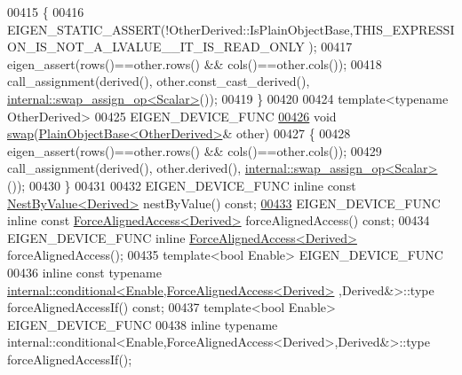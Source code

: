 \begin{DoxyCode}
00415     \{
00416       EIGEN\_STATIC\_ASSERT(!OtherDerived::IsPlainObjectBase,THIS\_EXPRESSION\_IS\_NOT\_A\_LVALUE\_\_IT\_IS\_READ\_ONLY
      );
00417       eigen\_assert(rows()==other.rows() && cols()==other.cols());
00418       call\_assignment(derived(), other.const\_cast\_derived(), 
      \hyperlink{struct_eigen_1_1internal_1_1swap__assign__op}{internal::swap\_assign\_op<Scalar>}());
00419     \}
00420 
00424     \textcolor{keyword}{template}<\textcolor{keyword}{typename} OtherDerived>
00425     EIGEN\_DEVICE\_FUNC
\hyperlink{group___core___module_aaab63cc56d30cc7c23a80304ab94ba2e}{00426}     \textcolor{keywordtype}{void} \hyperlink{group___core___module_aaab63cc56d30cc7c23a80304ab94ba2e}{swap}(\hyperlink{class_eigen_1_1_plain_object_base}{PlainObjectBase<OtherDerived>}& other)
00427     \{
00428       eigen\_assert(rows()==other.rows() && cols()==other.cols());
00429       call\_assignment(derived(), other.derived(), 
      \hyperlink{struct_eigen_1_1internal_1_1swap__assign__op}{internal::swap\_assign\_op<Scalar>}());
00430     \}
00431 
00432     EIGEN\_DEVICE\_FUNC \textcolor{keyword}{inline} \textcolor{keyword}{const} \hyperlink{group___core___module_class_eigen_1_1_nest_by_value}{NestByValue<Derived>} nestByValue() \textcolor{keyword}{const};
\hyperlink{group___core___module_ad3e01f9216955704228eaeac0b442d24}{00433}     EIGEN\_DEVICE\_FUNC \textcolor{keyword}{inline} \textcolor{keyword}{const} \hyperlink{group___core___module_class_eigen_1_1_force_aligned_access}{ForceAlignedAccess<Derived>} 
      forceAlignedAccess() \textcolor{keyword}{const};
00434     EIGEN\_DEVICE\_FUNC \textcolor{keyword}{inline} \hyperlink{group___core___module_class_eigen_1_1_force_aligned_access}{ForceAlignedAccess<Derived>} forceAlignedAccess();
00435     \textcolor{keyword}{template}<\textcolor{keywordtype}{bool} Enable> EIGEN\_DEVICE\_FUNC
00436     \textcolor{keyword}{inline} \textcolor{keyword}{const} \textcolor{keyword}{typename} 
      \hyperlink{struct_eigen_1_1internal_1_1conditional}{internal::conditional<Enable,ForceAlignedAccess<Derived>}
      ,Derived&>::type forceAlignedAccessIf() \textcolor{keyword}{const};
00437     \textcolor{keyword}{template}<\textcolor{keywordtype}{bool} Enable> EIGEN\_DEVICE\_FUNC
00438     \textcolor{keyword}{inline} \textcolor{keyword}{typename} internal::conditional<Enable,ForceAlignedAccess<Derived>,Derived&>::type 
      forceAlignedAccessIf();

\end{DoxyCode}
